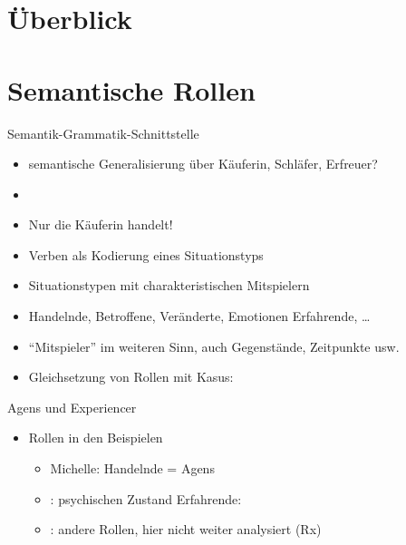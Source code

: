 \section{Überblick}

\section{Semantische Rollen}

\begin{frame}
  {Semantik-Grammatik-Schnittstelle}
  \pause
  \begin{exe}
    \ex
    \begin{xlist}
      \pause
      \pause
    \end{xlist}
  \end{exe}
  \pause
  \Halbzeile
  \begin{itemize}[<+->]
    \item semantische Generalisierung über \alert{Käuferin}, \alert{Schläfer}, \alert{Erfreuer}?
    \item {}
    \item Nur die \alert{Käuferin} handelt!
      \Halbzeile
    \item Verben als Kodierung eines \alert{Situationstyps} 
    \item Situationstypen mit charakteristischen \alert{Mitspielern}
    \item Handelnde, Betroffene, Veränderte, Emotionen Erfahrende, \ldots
    \item "`Mitspieler"' im weiteren Sinn, auch Gegenstände, Zeitpunkte usw.
      \Halbzeile
    \item Gleichsetzung von Rollen mit Kasus: 
  \end{itemize}
\end{frame}

\begin{frame}
  {Agens und Experiencer}
  \pause
  \begin{exe}
    \ex
    \begin{xlist}
    \end{xlist}
  \end{exe}
  \pause
  \Halbzeile
  \begin{itemize}[<+->]
    \item Rollen in den Beispielen
      \begin{itemize}[<+->]
        \item \alert{Michelle}: Handelnde = \alert{Agens}
        \item {}: psychischen Zustand Erfahrende: 
        \item {}: andere Rollen, hier nicht weiter analysiert (Rx)
      \end{itemize}
  \end{itemize}
\end{frame}


